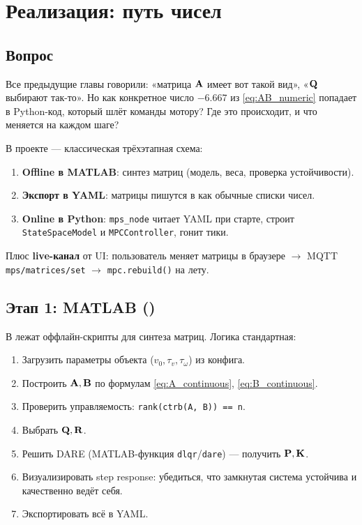 \chapter{Реализация: путь чисел}
\label{ch:implementation}

\section{Вопрос}

Все предыдущие главы говорили: «матрица $\mathbf{A}$ имеет вот такой
вид», «$\mathbf{Q}$ выбирают так-то». Но как конкретное число $-6.667$ из
\eqref{eq:AB_numeric} попадает в Python-код, который шлёт команды
мотору? Где это происходит, и что меняется на каждом шаге?

\begin{ideabox}
В проекте --- классическая трёхэтапная схема:
\begin{enumerate}
  \item \textbf{Offline в MATLAB}: синтез матриц (модель, веса,
        проверка устойчивости).
  \item \textbf{Экспорт в YAML}: матрицы пишутся в 
        как обычные списки чисел.
  \item \textbf{Online в Python}: \texttt{mps\_node} читает YAML при старте,
        строит \texttt{StateSpaceModel} и \texttt{MPCController}, гонит
        тики.
\end{enumerate}
Плюс \textbf{live-канал} от UI: пользователь меняет матрицы в браузере
$\to$ MQTT \texttt{mps/matrices/set} $\to$ \texttt{mpc.rebuild()} на лету.
\end{ideabox}

\section{Этап 1: MATLAB ()}

В  лежат оффлайн-скрипты для синтеза матриц.
Логика стандартная:

\begin{enumerate}
  \item Загрузить параметры объекта ($v_0, \tau_v, \tau_\omega$) из конфига.
  \item Построить $\mathbf{A}, \mathbf{B}$ по формулам \eqref{eq:A_continuous},
        \eqref{eq:B_continuous}.
  \item Проверить управляемость: \texttt{rank(ctrb(A, B)) == n}.
  \item Выбрать $\mathbf{Q}, \mathbf{R}$.
  \item Решить DARE (MATLAB-функция \texttt{dlqr}/\texttt{dare}) ---
        получить $\mathbf{P}, \mathbf{K}$.
  \item Визуализировать step response: убедиться, что замкнутая
        система устойчива и качественно ведёт себя.
  \item Экспортировать всё в YAML.
\end{enumerate}


